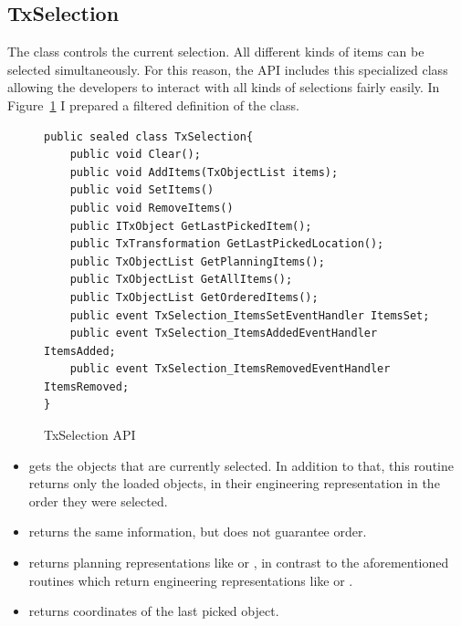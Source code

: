 \subsection{TxSelection}

The  class controls the current selection. All different kinds of items can be selected simultaneously. For this reason, the API includes this specialized class allowing the developers to interact with all kinds of selections fairly easily. In Figure~\ref{fig:CodeTxSelection} I prepared a filtered definition of the class.

\begin{figure}[H]
    \caption{TxSelection API}
    \centering
    \begin{verbatim}
public sealed class TxSelection{
    public void Clear();
    public void AddItems(TxObjectList items);
    public void SetItems()
    public void RemoveItems()
    public ITxObject GetLastPickedItem();
    public TxTransformation GetLastPickedLocation();
    public TxObjectList GetPlanningItems();
    public TxObjectList GetAllItems();
    public TxObjectList GetOrderedItems();
    public event TxSelection_ItemsSetEventHandler ItemsSet;
    public event TxSelection_ItemsAddedEventHandler ItemsAdded;
    public event TxSelection_ItemsRemovedEventHandler ItemsRemoved;
}
    \end{verbatim}
    \label{fig:CodeTxSelection}
\end{figure}

\begin{itemize}

\item {} gets the objects that are currently selected.
In addition to that, this routine returns only the loaded objects, in their engineering representation in the order they were selected.

\item {} returns the same information, but does not guarantee order.

\item {} returns planning representations like 
 or , in contrast to the aforementioned routines which return engineering representations like  or .

\item {} returns coordinates of the last picked object.

\end{itemize}

